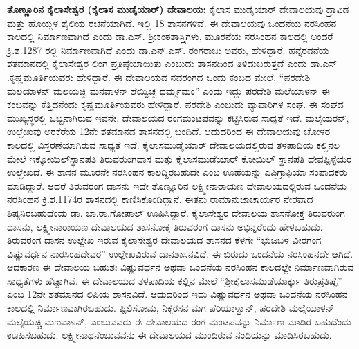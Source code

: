 \textbf{ತೊಣ್ಣೂರಿನ ಕೈಲಾಸೇಶ್ವರ (ಕೈಲಾಸ ಮುಡೈಯಾರ್​) ದೇವಾಲಯ:} ಕೈಲಾಸ ಮುಡೈಯಾರ್​ ದೇವಾಲಯವು ದ್ರಾವಿಡ ಮತ್ತು ಹೊಯ್ಸಳ ಶೈಲಿಯ ರಚನೆಯಾಗಿದೆ. ಇಲ್ಲಿ 18 ಶಾಸನಗಳಿವೆ. ಈ ದೇವಾಲಯವು ಒಂದನೆಯ ನರಸಿಂಹನ ಕಾಲದಲ್ಲಿ ನಿರ್ಮಾಣವಾಗಿದೆ ಎಂದು ಡಾ.ಎಸ್​. ಶ‍್ರೀಕಂಠಶಾಸ್ತ್ರಿಗಳು, ಮೂರನೆಯ ನರಸಿಂಹನ ಕಾಲದಲ್ಲಿ ಅಂದರೆ ಕ್ರಿ.ಶ.1287 ರಲ್ಲಿ ನಿರ್ಮಾಣವಾಗಿದೆ ಎಂದು ಡಾ.ಎನ್​.ಎಸ್​. ರಂಗರಾಜು ಅವರು, ಹೇಳಿದ್ದಾರೆ. ಹನ್ನೆರಡನೆಯ ಶತಮಾನದಲ್ಲಿ ಕೈಲಾಸೇಶ್ವರ ಲಿಂಗ ಪ್ರತಿಷ್ಠೆಯಾಯಿತು ಎಂಬುದು ಶಾಸನದಿಂದ ತಿಳಿದುಬರುತ್ತದೆ ಎಂದು ಡಾ.ಎಸ್​.ಕೃಷ್ಣಮೂರ್ತಿಯವರು ಹೇಳಿದ್ದಾರೆ. ಈ ದೇವಾಲಯದ ನವರಂಗದ ಒಂದು ಕಂಬದ ಮೇಲೆ, “ಪರದೇಶಿ ಮಲಯಾಳನ್​ ಮಲಯಚ್ಚಿ ಮನವಾಳನ್​ ಶೆಯ್ವಿಚ್ಚ ಧರ್ಮ್ಮಮಂ” ಎಂದು ಇದ್ದು ಪರದೇಶಿ ಮಲೆಯಾಳನ್​ ಈ ಕಂಬವನ್ನು ಕೆತ್ತಿದನೆಂದು ಕೃಷ್ಣಮೂರ್ತಿಯವರು ಹೇಳಿದ್ದಾರೆ. ಪರದೇಶಿ ಎಂಬುದು ವ್ಯಾಪಾರಿಗಳ ಸಂಘ. ಈ ಸಂಘದ ಮುಖ್ಯಸ್ಥರಲ್ಲಿ ಒಬ್ಬನಾಗಿರುವ ಇವನೇ, ದೇವಾಲಯದ ರಂಗಮಂಟಪವನ್ನು ಕಟ್ಟಿಸಿರುವ ಸಾಧ್ಯತೆ ಇದೆ. ಮಲೈಯರನ್​, ಉಲ್ಲೇಖವು ಅರಕೆರೆಯ 12ನೇ ಶತಮಾನದ ಶಾಸನದಲ್ಲಿ ಬಂದಿದೆ. ಆದುದರಿಂದ ಈ ದೇವಾಲಯವು ಚೋಳರ ಕಾಲದಲ್ಲಿ ವಿಸ್ತರಣೆಯಾಗಿರುವ ಸಾಧ್ಯತೆ ಇದೆ. ಕೈಲಾಸಮುಡೈಯಾರ್​ ದೇವಾಲಯದಲ್ಲಿರುವ ತಳಪಾದಿಯ ಕಲ್ಲಿನಲ ಮೇಲೆ ಇಕ್ಕೋಯಿಲ್​ ಸ್ಥಾನಪತಿ ತಿರುವರುಂಗದಾಸ ಮತ್ತು ಕೈಲಾಸಮುಡೆಯಾರ್​ ಕೋಯಿಲ್​ ಸ್ಥಾನಪತಿ ದೇವಪ್ಪಿಳ್ಳೆಯರ ಉಲ್ಲೇಖದೆ. ಈ ಶಾಸನ ಮೂರನೇ ನರಸಿಂಹನ ಕಾಲದ್ದಿರಬಹುದೇ ಎಂಬ ಊಹೆಯನ್ನು ಎಪಿಗ್ರಾಫಿಯಾ ಸಂಪಾದಕರು ಮಾಡಿದ್ದಾರೆ. ಆದರೆ ತಿರುವರಂಗ ದಾಸನು ಇದೇ ತೊಣ್ಣೂರಿನ ಲಕ್ಷ್ಮೀನಾರಾಯಣ ದೇವಾಲಯದಲ್ಲಿರುವ ಒಂದನೆಯ ನರಸಿಂಹನ ಕ್ರಿ.ಶ.1174ರ ಶಾಸನದಲ್ಲಿ ಕಾಣಿಸಿಕೊಂಡಿದ್ದಾನೆ. ಈತನು ರಾಮಾನುಜಾಚಾರ್ಯರ ನೇರವಾದ ಶಿಷ್ಯನಿರಬಹುದೆಂದು ಡಾ. ಬಾ.ರಾ.ಗೋಪಾಲ್​ ಊಹಿಸಿದ್ದಾರೆ. ಕೈಲಾಸೇಶ್ವರ ದೇವಾಲಯ ಶಾಸನೋಕ್ತ ತಿರುವರುಂಗ ದಾಸನು, ಲಕ್ಷ್ಮೀನಾರಾಯಣ ದೇವಾಲಯದ ಶಾಸನೋಕ್ತ ತಿರುವರಂಗ ದಾಸನು ಅಭಿನ್ನರೆಂದು ಹೇಳಬಹುದು. ತಿರುವರಂಗ ದಾಸನ ಉಲ್ಲೇಖ ಇರುವ ಕೈಲಾಸೇಶ್ವರ ದೇವಾಲಯದ ಶಾಸನದ ಕೆಳಗೇ “ಭುಜಬಳ ವೀರಗಂಗ ವಿಷ್ಣುವರ್ಧನ ನಾರಸಿಂಹದೇವರ” ಉಲ್ಲೇಖವಿರುವ ದಾನಶಾಸನವಿದೆ. ಈ ಬಿರುದು ಒಂದನೆಯ ನರಸಿಂಹನದೇ ಆಗಿದೆ. ಆದಕಾರಣ ಈ ದೇವಾಲಯ ಬಹುಶಃ ವಿಷ್ಣುವರ್ಧನ ಅಥವಾ ಒಂದನೆಯ ನರಸಿಂಹನ ಕಾಲದಲ್ಲೇ ನಿರ್ಮಾಣವಾಗಿರುವ ಸಾಧ್ಯತೆಗಳು ಹೆಚ್ಚಾಗಿವೆ. ಈ ದೇವಾಲಯದ ತಳಪಾದಿಯ ಕಲ್ಲಿನ ಮೇಲೆ “ಶ‍್ರೀಕೈಲಾಸಮುಡೆಯಾರ್ಕ್ಕು ತಿರುಪ್ರತಿಷ್ಠೈ” ಎಂಬ 12ನೇ ಶತಮಾನದ ಲಿಪಿಯ ಶಾಸನವಿದೆ. ಆದುದರಿಂದ ಇದು ವಿಷ್ಣುವರ್ಧನ ಅಥವಾ ಒಂದನೆಯ ನರಸಿಂಹನ ಕಾಲದಲ್ಲಿ ನಿರ್ಮಾಣವಾಗಿರಬಹುದು. ಪ್ಪಿಲಿಸೋಮ, ನಿಕ್ಕರಸನ ಮಗ ಪೆರಿಯಾಳ್ವಾನ್​, ಪರದೇಶಿ ಮಲೈಯಾಳನ್​ ಮಲೈಯಚ್ಚಿ ಮಣವಾಳನ್​, ಎಂಬುವವರು ಈ ದೇವಾಲಯದ ರಂಗ ಮಂಟಪವನ್ನು ನಿರ್ಮಾಣ ಮಾಡಿರ ಬಹುದೆಂದು ಊಹಿಸಬಹುದು. ಲಕ್ಷ್ಮೀನಾಥನೆಂಬುವವನು ಈ ದೇವಾಲಯದ ಮುಂದಿರುವ ನಂದಿಯನ್ನು ಮಾಡಿಸಿರಬಹುದು.

